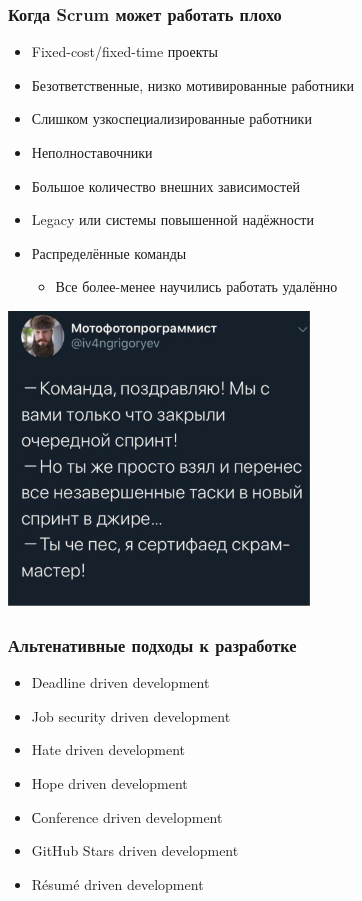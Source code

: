 \documentclass{../../slides-style}
\begin{document}
    \begin{frame}
        \frametitle{Когда Scrum может работать плохо}
        \begin{itemize}
            \item Fixed-cost/fixed-time проекты
            \item Безответственные, низко мотивированные работники
            \item Слишком узкоспециализированные работники
            \item Неполноставочники
            \item Большое количество внешних зависимостей
            \item Legacy или системы повышенной надёжности
            \item Распределённые команды
            \begin{itemize}
                \item Все более-менее научились работать удалённо
            \end{itemize}
        \end{itemize}
    \end{frame}

    \begin{frame}
        \begin{center}
            \includegraphics[width=0.6\textwidth]{nextSprint.png}
        \end{center}
    \end{frame}

    \begin{frame}
        \frametitle{Альтенативные подходы к разработке}
        \begin{itemize}
            \item Deadline driven development
            \item Job security driven development
            \item Hate driven development
            \item Hope driven development
            \item Сonference driven development
            \item GitHub Stars driven development
            \item Résumé driven development
        \end{itemize}
    \end{frame}
\end{document}
